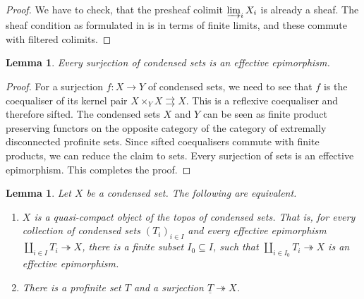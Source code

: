 \documentclass{amsart}
\newtheorem{lem}[prop]{Lemma}
\theoremstyle{definition}
\theoremstyle{remark}
\begin{document}
\begin{proof}
    We have to check, that the presheaf colimit $\varinjlim_i X_i$ is already a sheaf. The sheaf condition as formulated in \cite[Section 1]{ScholzeCond} is in terms of finite limits, and these commute with filtered colimits.
\end{proof}


\begin{lem}\label{all_effective}
    Every surjection of condensed sets is an effective epimorphism.
\end{lem}

\begin{proof}
    For a surjection $f : X \to Y$ of condensed sets, we need to see that $f$ is the coequaliser of its kernel pair
    $X \times_Y X \rightrightarrows X$. This is a reflexive coequaliser and therefore sifted. The condensed sets $X$ and $Y$ can be seen as finite product preserving functors on the opposite category of the category of extremally disconnected profinite sets. Since sifted coequalisers commute with finite products, we can reduce the claim to sets. Every surjection of sets is an effective epimorphism. This completes the proof.
\end{proof}

\begin{lem}\label{char_qc}
    Let $X$ be a condensed set. The following are equivalent.
    \begin{enumerate}
        \item $X$ is a quasi-compact object of the topos of condensed sets. That is, for every collection of condensed sets $(T_i)_{i \in I}$ and every effective epimorphism $\coprod_{i \in I} T_i \twoheadrightarrow X$, there is a finite subset $I_0 \subseteq I$, such that $\coprod_{i \in I_0} T_i \twoheadrightarrow X$ is an effective epimorphism.
        \item There is a profinite set $T$ and a surjection $\underline T \twoheadrightarrow X$.
    \end{enumerate}
\end{lem}
\end{document}
